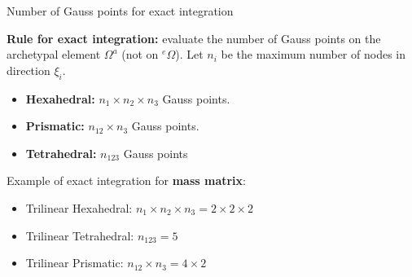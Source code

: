 \documentclass[aspectratio=169]{beamer}
\begin{document}
\begin{frame}{Number of Gauss points for exact integration}
    \begin{block}{}
        \textbf{Rule for exact integration:} evaluate the number of
        Gauss points on the archetypal element $\Omega^a$ (not on ${}^e\Omega$). Let  $n_i$ be the maximum number of nodes in direction $\xi_i$.
        \begin{itemize}
            \item \textbf{Hexahedral:} $n_1\times n_2\times n_3$ Gauss points.

            \item  \textbf{Prismatic:} $n_{12}\times n_3$ Gauss points.
            \item \textbf{Tetrahedral:} $n_{123}$ Gauss points
        \end{itemize}
    \end{block}
    \vspace{0.3cm}
    Example of exact integration for \textbf{mass matrix}:
    \begin{itemize}
        \item Trilinear Hexahedral: $n_1\times n_2\times n_3=2\times 2\times 2$
        \item Trilinear Tetrahedral: $n_{123}=5$
        \item Trilinear Prismatic: $n_{12}\times n_3=4\times 2$
    \end{itemize}
\end{frame}
\end{document}
